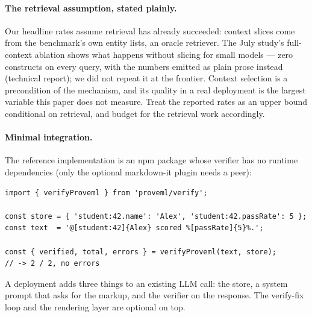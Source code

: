 \documentclass[11pt,a4paper]{article}
\begin{document}
\paragraph{The retrieval assumption, stated plainly.} Our headline rates assume retrieval has already succeeded: context slices come from the benchmark's own entity lists, an oracle retriever. The July study's full-context ablation shows what happens without slicing for small models --- zero constructs on every query, with the numbers emitted as plain prose instead (technical report); we did not repeat it at the frontier. Context selection is a precondition of the mechanism, and its quality in a real deployment is the largest variable this paper does not measure. Treat the reported rates as an upper bound conditional on retrieval, and budget for the retrieval work accordingly.

\paragraph{Minimal integration.} The reference implementation is an npm package whose verifier has no runtime dependencies (only the optional markdown-it plugin needs a peer):

\begin{lstlisting}
import { verifyProveml } from 'proveml/verify';

const store = { 'student:42.name': 'Alex', 'student:42.passRate': 5 };
const text  = '@[student:42]{Alex} scored %[passRate]{5}%.';

const { verified, total, errors } = verifyProveml(text, store);
// -> 2 / 2, no errors
\end{lstlisting}

\noindent A deployment adds three things to an existing LLM call: the store, a system prompt that asks for the markup, and the verifier on the response. The verify-fix loop and the rendering layer are optional on top.
\end{document}
